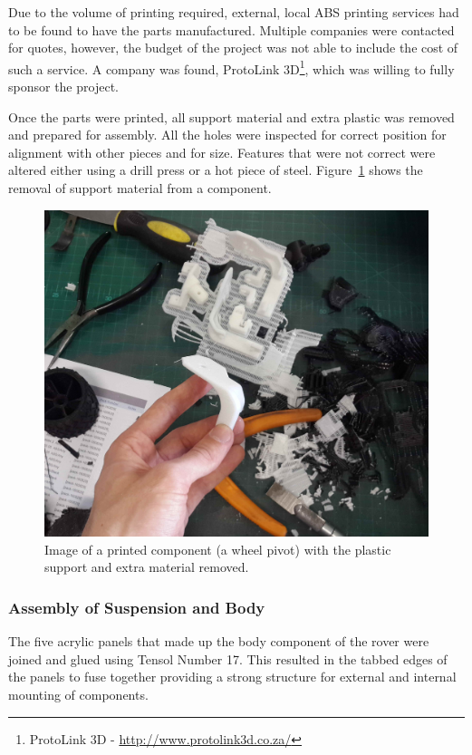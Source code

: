       Due to the volume of printing required, external, local ABS printing services had to be found to have the parts manufactured. Multiple companies were contacted for quotes, however, the budget of the project was not able to include the cost of such a service. A company was found, ProtoLink 3D\footnote{ProtoLink 3D - \url{http://www.protolink3d.co.za/}}, which was willing to fully sponsor the project.
      
      Once the parts were printed, all support material and extra plastic was removed and prepared for assembly. All the holes were inspected for correct position for alignment with other pieces and for size. Features that were not correct were altered either using a drill press or a hot piece of steel. Figure~\ref{fig:mechBuild-removalOfPlasticSupport} shows the removal of support material from a component.
      
      \begin{figure}[h!]
        \centering
        \includegraphics[width=0.6\linewidth]{figures/mechBuild-removalOfPlasticSupport}
        \caption[Image of a printed component (a wheel strut) with the plastic support and extra material removed.]{Image of a printed component (a wheel pivot) with the plastic support and extra material removed.}
        \label{fig:mechBuild-removalOfPlasticSupport}
      \end{figure}
    
    \subsubsection{Assembly of Suspension and Body}
      The five acrylic panels that made up the body component of the rover were joined and glued using Tensol Number 17. This resulted in the tabbed edges of the panels to fuse together providing a strong structure for external and internal mounting of components. 
      
